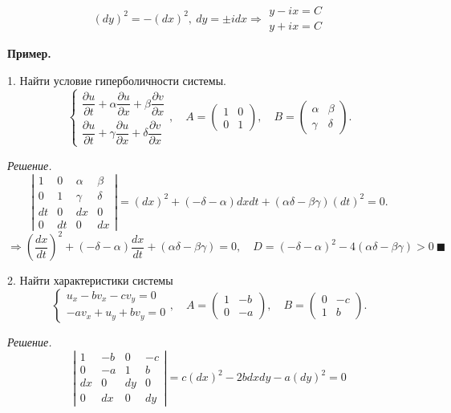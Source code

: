 \documentclass[9pt]{article}
\begin{document}
\[(dy)^2=-(dx)^2,\ dy=\pm idx\Rightarrow
\begin{array}{l}
    y-ix=C \\
    y+ix=C
\end{array}\]
\par\textbf{Пример.}
\par1. Найти условие гиперболичности системы.
\[\left\{\begin{array}{l}
    \dfrac{\partial u}{\partial t}+\alpha\dfrac{\partial u}{\partial x}+\beta\dfrac{\partial v}{\partial x} \\
    \dfrac{\partial u}{\partial t}+\gamma\dfrac{\partial u}{\partial x}+\delta\dfrac{\partial v}{\partial x}
\end{array}\right.,\quad A=\left(
\begin{array}{cc}
    1 & 0 \\
    0 & 1
\end{array}\right),\quad B=\left(
\begin{array}{cc}
    \alpha & \beta \\
    \gamma & \delta
\end{array}\right).\]
\par\textit{Решение.}
\[\left|
\begin{array}{cccc}
    1 & 0 & \alpha & \beta \\
    0 & 1 & \gamma & \delta \\
    dt & 0 & dx & 0 \\
    0 & dt & 0 & dx
\end{array}\right|=(dx)^2+(-\delta-\alpha)dxdt+(\alpha\delta-\beta\gamma)(dt)^2=0.\]
\[\Rightarrow\left(\dfrac{dx}{dt}\right)^2+(-\delta-\alpha)\dfrac{dx}{dt}+(\alpha\delta-\beta\gamma)=0,\quad D=(-\delta-\alpha)^2-4(\alpha\delta-\beta\gamma)>0\ \blacksquare\]
\par2. Найти характеристики системы
\[\left\{\begin{array}{l}
    u_x-bv_x-cv_y=0 \\
    -av_x+u_y+bv_y=0
\end{array}\right.,\quad A=\left(
\begin{array}{cc}
    1 & -b \\
    0 & -a
\end{array}\right),\quad B=\left(
\begin{array}{cc}
    0 & -c \\
    1 & b
\end{array}\right).\]
\par\textit{Решение.} \[\left|
\begin{array}{cccc}
    1 & -b & 0 & -c \\
    0 & -a & 1 & b \\
    dx & 0 & dy & 0 \\
    0 & dx & 0 & dy
\end{array}\right|=c(dx)^2-2bdxdy-a(dy)^2=0\]
\end{document}
